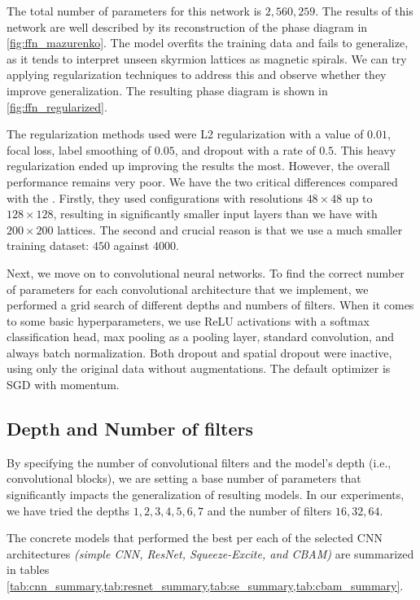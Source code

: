 The total number of parameters for this network is $2,560,259$. The results of this network are well described by its reconstruction of the phase diagram in \ref{fig:ffn_mazurenko}. The model overfits the training data and fails to generalize, as it tends to interpret unseen skyrmion lattices as magnetic spirals. We can try applying regularization techniques to address this and observe whether they improve generalization. The resulting phase diagram is shown in \ref{fig:ffn_regularized}.

The regularization methods used were L2 regularization with a value of $0.01$, focal loss, label smoothing of $0.05$, and dropout with a rate of $0.5$. This heavy regularization ended up improving the results the most. However, the overall performance remains very poor. We have the two critical differences compared with the \cite{iakovlev2018supervised}. Firstly, they used configurations with resolutions $48 \times 48$ up to $128 \times 128$, resulting in significantly smaller input layers than we have with $200 \times 200$ lattices. The second and crucial reason is that we use a much smaller training dataset: $450$ against $4000$.

Next, we move on to convolutional neural networks. To find the correct number of parameters for each convolutional architecture that we implement, we performed a grid search of different depths and numbers of filters. When it comes to some basic hyperparameters, we use ReLU activations with a softmax classification head, max pooling as a pooling layer, standard convolution, and always batch normalization. Both dropout and spatial dropout were inactive, using only the original data without augmentations. The default optimizer is SGD with momentum.

\subsection{Depth and Number of filters}

By specifying the number of convolutional filters and the model's depth (i.e., convolutional blocks), we are setting a base number of parameters that significantly impacts the generalization of resulting models. In our experiments, we have tried the depths $1, 2, 3, 4, 5, 6, 7$ and the number of filters $16, 32, 64$. 

The concrete models that performed the best per each of the selected CNN architectures \textit{(simple CNN, ResNet, Squeeze-Excite, and CBAM)} are summarized in tables \cref{tab:cnn_summary,tab:resnet_summary,tab:se_summary,tab:cbam_summary}.

